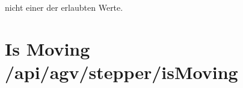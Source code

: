 \documentclass[letterpaper,10pt,english]{sphinxmanual}
\begin{document}
\sphinxAtStartPar
{}

\begin{sphinxVerbatim}[commandchars=\\\{\}]
\end{sphinxVerbatim}

\sphinxAtStartPar
{}

\begin{sphinxVerbatim}[commandchars=\\\{\}]
\end{sphinxVerbatim}

\sphinxAtStartPar
{}
\sphinxhyphen{}  \textendash{}  nicht einer der erlaubten Werte.


\section{Is Moving \textendash{} /api/agv/stepper/isMoving}
\label{\detokenize{agv_rest_api_stepper:is-moving-api-agv-stepper-ismoving}}\label{\detokenize{agv_rest_api_stepper:get-api-agv-stepper-ismoving}}
\end{document}
